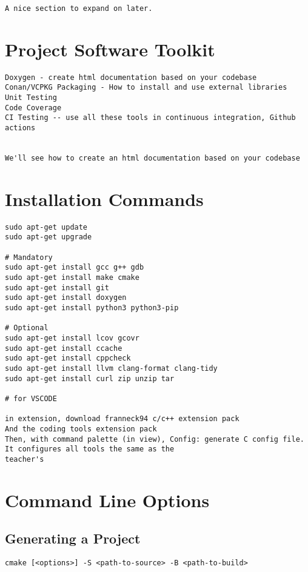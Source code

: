\begin{verbatim}
A nice section to expand on later.
\end{verbatim}

\section{Project Software Toolkit}

\begin{verbatim}
Doxygen - create html documentation based on your codebase
Conan/VCPKG Packaging - How to install and use external libraries
Unit Testing
Code Coverage
CI Testing -- use all these tools in continuous integration, Github actions


We'll see how to create an html documentation based on your codebase
\end{verbatim}

\section{Installation Commands}

\begin{verbatim}
sudo apt-get update
sudo apt-get upgrade

# Mandatory
sudo apt-get install gcc g++ gdb
sudo apt-get install make cmake
sudo apt-get install git
sudo apt-get install doxygen
sudo apt-get install python3 python3-pip

# Optional
sudo apt-get install lcov gcovr
sudo apt-get install ccache
sudo apt-get install cppcheck
sudo apt-get install llvm clang-format clang-tidy
sudo apt-get install curl zip unzip tar

# for VSCODE

in extension, download franneck94 c/c++ extension pack
And the coding tools extension pack
Then, with command palette (in view), Config: generate C config file. It configures all tools the same as the
teacher's
\end{verbatim}

\section{Command Line Options}

\subsection{Generating a Project}

\begin{verbatim}
cmake [<options>] -S <path-to-source> -B <path-to-build>
\end{verbatim}

